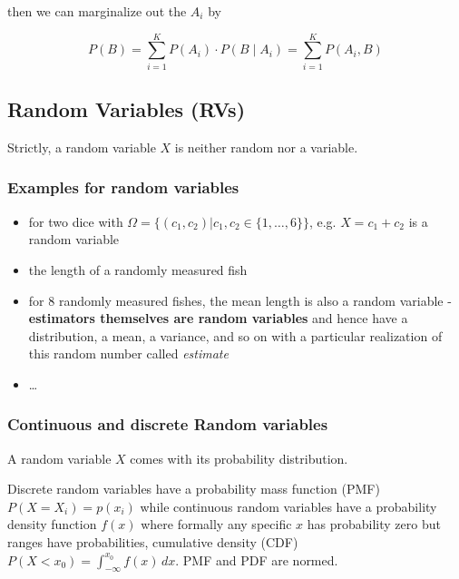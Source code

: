 then we can marginalize out the $A_i$ by

\begin{equation}
    P(B)=\sum_{i=1}^K P\left(A_i\right) \cdot P\left(B \mid A_i\right)=\sum_{i=1}^K P\left(A_i, B\right)
\end{equation}


\subsection{Random Variables (RVs)}
Strictly, a random variable $X$ is neither random nor a variable.

\subsubsection{Examples for random variables}
\begin{itemize}
    \item for two dice with $\Omega = \{(c_1,c_2)|c_1,c_2 \in \{1,\dots,6\}\}$, e.g. $X = c_1 + c_2$ is a random variable
    \item the length of a randomly measured fish
    \item for $8$ randomly measured fishes, the mean length is also a random variable - \textbf{estimators themselves are
    random variables} and hence have a distribution, a mean, a variance, and so on with a particular realization of this random number
    called \textit{estimate}
    \item \dots
\end{itemize}

\subsubsection{Continuous and discrete Random variables}
A random variable $X$ comes with its probability distribution.

Discrete random variables have a probability mass function (PMF)
$P(X = X_i) = p(x_i)$ while continuous random 
variables have a probability density function
$f(x)$ where formally any specific $x$ has probability
zero but ranges have probabilities, cumulative density (CDF) $P(X<x_0) = \int_{-\infty}^{x_0}
f(x) \, dx$. PMF and PDF are normed.

